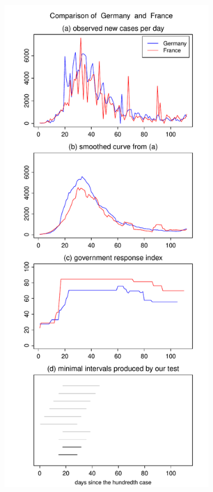 \documentclass[a4paper,12pt]{article}
\numberwithin{equation}{section}
\begin{document}
\begin{figure}[t!]
\begin{subfigure}[b]{0.49\textwidth}
\end{subfigure}\hspace{0.55cm}
\begin{subfigure}[b]{0.49\textwidth}
\includegraphics[width=\textwidth]{plots/DEU_vs_FRA}
\end{subfigure}
\vspace{0.25cm}


\end{figure}
\end{document}
